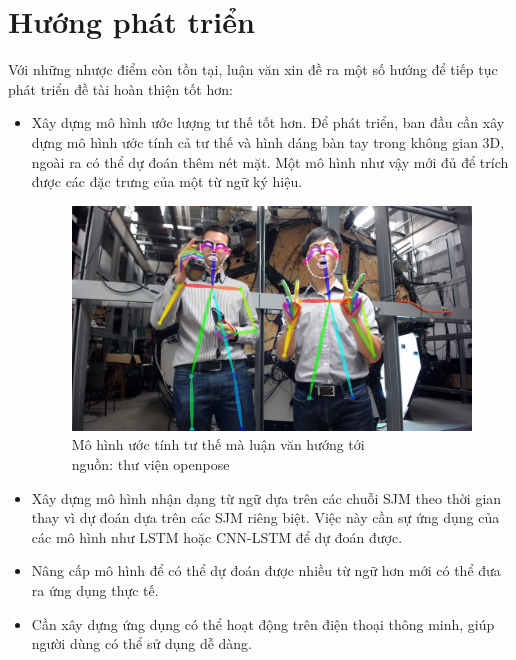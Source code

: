 \section{Hướng phát triển}
Với những nhược điểm còn tồn tại, luận văn xin đề ra một số hướng để tiếp tục phát triển đề tài hoàn thiện tốt hơn:
\begin{itemize}
\item Xây dựng mô hình ước lượng tư thế tốt hơn. Để phát triển, ban đầu cần xây dựng mô hình ước tính cả tư thế và hình dáng bàn tay trong không gian 3D, ngoài ra có thể dự đoán thêm nét mặt. Một mô hình như vậy mới đủ để trích được các đặc trưng của một từ ngữ ký hiệu. 

\FloatBarrier
\begin{figure}[htp]
\begin{center}
\includegraphics[scale=0.3]{chap7/c7_figs/open_pose.jpg}
\end{center}
\caption{Mô hình ước tính tư thế mà luận văn hướng tới \\ nguồn: thư viện openpose}
\label{fig:openpose}
\end{figure}
\FloatBarrier

\item Xây dựng mô hình nhận dạng từ ngữ dựa trên các chuỗi SJM theo thời gian thay vì dự đoán dựa trên các SJM riêng biệt. Việc này cần sự ứng dụng của các mô hình như LSTM hoặc CNN-LSTM để dự đoán được.

\item Nâng cấp mô hình để có thể dự đoán được nhiều từ ngữ hơn mới có thể đưa ra ứng dụng thực tế.

\item Cần xây dựng ứng dụng có thể hoạt động trên điện thoại thông minh, giúp người dùng có thể sử dụng dễ dàng.

\end{itemize}

